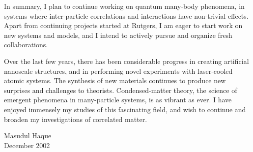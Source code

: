 \documentclass[11pt]{article}
\begin{document}
\vspace{0.2cm}

In summary, I plan to continue working on quantum many-body phenomena,
in systems where inter-particle correlations and interactions have
non-trivial effects.  Apart from continuing projects started at
Rutgers, I am eager to start work on new systems and models, and I
intend to actively pursue and organize fresh collaborations.


Over the last few years, there has been considerable progress in
creating artificial nanoscale structures, and in performing novel
experiments with laser-cooled atomic systems.  The synthesis of new
materials continues to produce new surprises and challenges to
theorists.  Condensed-matter theory, the science of emergent phenomena
in many-particle systems, is as vibrant as ever.  I have enjoyed
immensely my studies of this fascinating field, and wish to continue
and broaden my investigations of correlated matter.


\vspace{2cm}

\begin{flushright}
Masudul Haque\\
December 2002
\end{flushright}
\end{document}
